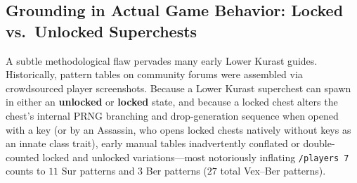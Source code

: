 \documentclass[11pt,reqno]{amsart}
\theoremstyle{definition}
\begin{document}
\subsection{Grounding in Actual Game Behavior: Locked vs.\ Unlocked Superchests}

A subtle methodological flaw pervades many early Lower Kurast guides. Historically, pattern tables on community forums were assembled via crowdsourced player screenshots. Because a Lower Kurast superchest can spawn in either an \textbf{unlocked} or \textbf{locked} state, and because a locked chest alters the chest's internal PRNG branching and drop-generation sequence when opened with a key (or by an Assassin, who opens locked chests natively without keys as an innate class trait), early manual tables inadvertently conflated or double-counted locked and unlocked variations—most notoriously inflating \texttt{/players~7} counts to $11$ Sur patterns and $3$ Ber patterns ($27$ total Vex--Ber patterns).
\end{document}
